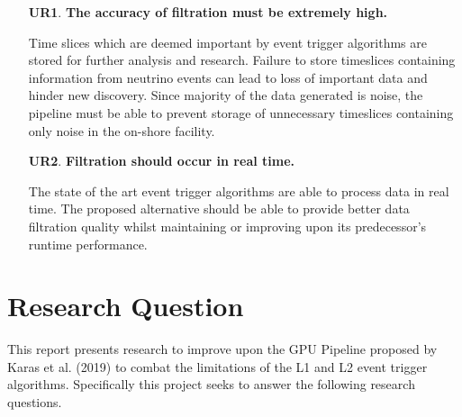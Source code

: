 \begin{enumerate}
  \item[\textbf{UR1}.]\textbf{The accuracy of filtration must be extremely high.}

    Time slices which are deemed important by event trigger algorithms
    are stored for further analysis and research. Failure to store
    timeslices containing information from neutrino events can lead to
    loss of important data and hinder new discovery. Since majority of
    the data generated is noise, the pipeline must be able to prevent
    storage of unnecessary timeslices containing only noise in the
    on-shore facility.

  \item[\textbf{UR2}.] \textbf{Filtration should occur in real time.}

    The state of the art event trigger algorithms are able to process
    data in real time. The proposed alternative should be able to
    provide better data filtration quality whilst maintaining or
    improving upon its predecessor's runtime performance.

\end{enumerate}

\section{Research Question}
\label{sec:rqs}

This report presents research to improve upon the GPU Pipeline
proposed by Karas et al. (2019) to combat the limitations of the L1
and L2 event trigger algorithms. Specifically this project seeks to
answer the following research questions.

